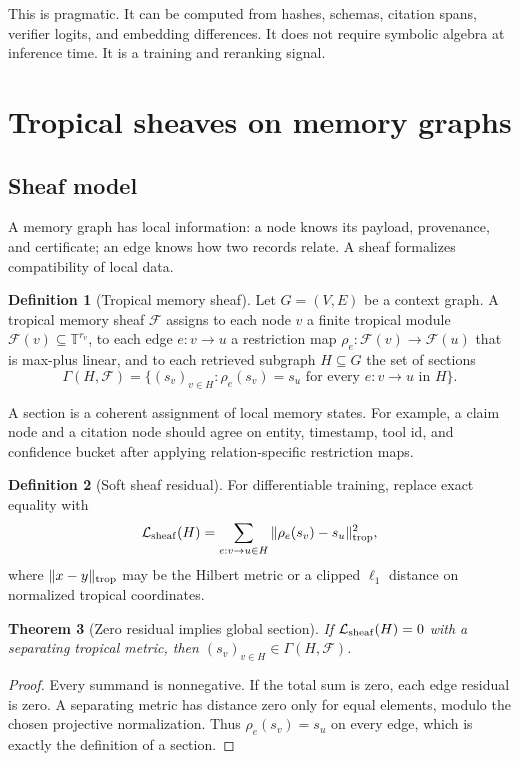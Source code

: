 \documentclass[11pt]{article}
\newtheorem{theorem}{Theorem}[section]
\theoremstyle{definition}
\newtheorem{definition}[theorem]{Definition}
\theoremstyle{remark}
\newcommand{\T}{\mathbb{T}}
\begin{document}
This is pragmatic. It can be computed from hashes, schemas, citation spans, verifier logits, and embedding differences. It does not require symbolic algebra at inference time. It is a training and reranking signal.

\section{Tropical sheaves on memory graphs}

\subsection{Sheaf model}

A memory graph has local information: a node knows its payload, provenance, and certificate; an edge knows how two records relate. A sheaf formalizes compatibility of local data.

\begin{definition}[Tropical memory sheaf]
Let \(G=(V,E)\) be a context graph. A tropical memory sheaf \(\mathcal F\) assigns to each node \(v\) a finite tropical module \(\mathcal F(v)\subseteq\T^{r_v}\), to each edge \(e:v\to u\) a restriction map \(\rho_{e}:\mathcal F(v)\to\mathcal F(u)\) that is max-plus linear, and to each retrieved subgraph \(H\subseteq G\) the set of sections
\[
    \Gamma(H,\mathcal F)=\{(s_v)_{v\in H}:\rho_e(s_v)=s_u\text{ for every }e:v\to u\text{ in }H\}.
\]
\end{definition}

A section is a coherent assignment of local memory states. For example, a claim node and a citation node should agree on entity, timestamp, tool id, and confidence bucket after applying relation-specific restriction maps.

\begin{definition}[Soft sheaf residual]
For differentiable training, replace exact equality with
\[
    \mathcal L_{\rm sheaf}(H)=\sum_{e:v\to u\in H}\|\rho_e(s_v)-s_u\|_{\rm trop}^2,
\]
where \(\|x-y\|_{\rm trop}\) may be the Hilbert metric or a clipped \(\ell_1\) distance on normalized tropical coordinates.
\end{definition}

\begin{theorem}[Zero residual implies global section]
If \(\mathcal L_{\rm sheaf}(H)=0\) with a separating tropical metric, then \((s_v)_{v\in H}\in\Gamma(H,\mathcal F)\).
\end{theorem}
\begin{proof}
Every summand is nonnegative. If the total sum is zero, each edge residual is zero. A separating metric has distance zero only for equal elements, modulo the chosen projective normalization. Thus \(\rho_e(s_v)=s_u\) on every edge, which is exactly the definition of a section.
\end{proof}
\end{document}
